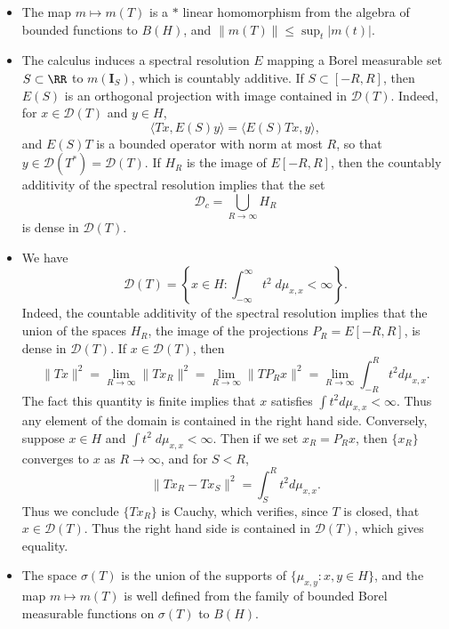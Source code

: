 \begin{itemize}
    \item The map $m \mapsto m(T)$ is a $*$ linear homomorphism from the algebra of bounded functions to $B(H)$, and $\| m(T) \| \leq \sup_t |m(t)|$.

    \item The calculus induces a spectral resolution $E$ mapping a Borel measurable set $S \subset \RR$ to $m(\mathbf{I}_S)$, which is countably additive. If $S \subset [-R,R]$, then $E(S)$ is an orthogonal projection with image contained in $\mathcal{D}(T)$. Indeed, for $x \in \mathcal{D}(T)$ and $y \in H$,
    \[ \langle Tx, E(S) y \rangle = \langle E(S) T x, y \rangle, \]
    and $E(S) T$ is a bounded operator with norm at most $R$, so that $y \in \mathcal{D}(T^*) = \mathcal{D}(T)$. If $H_R$ is the image of $E[-R,R]$, then the countably additivity of the spectral resolution implies that the set
    \[ \mathcal{D}_c = \bigcup_{R \to \infty} H_R \]
    is dense in $\mathcal{D}(T)$.

    \item We have
    \[ \mathcal{D}(T) = \left\{ x \in H : \int_{-\infty}^\infty t^2\; d\mu_{x,x} < \infty \right\}. \]
    Indeed, the countable additivity of the spectral resolution implies that the union of the spaces $H_R$, the image of the projections $P_R = E[-R,R]$, is dense in $\mathcal{D}(T)$. If $x \in \mathcal{D}(T)$, then
    \[ \| Tx \|^2 = \lim_{R \to \infty} \| Tx_R \|^2 = \lim_{R \to \infty} \| TP_R x \|^2 = \lim_{R \to \infty} \int_{-R}^R t^2 d\mu_{x,x}. \]
    The fact this quantity is finite implies that $x$ satisfies $\int t^2 d\mu_{x,x} < \infty$. Thus any element of the domain is contained in the right hand side. Conversely, suppose $x \in H$ and $\int t^2\; d\mu_{x,x} < \infty$. Then if we set $x_R = P_R x$, then $\{ x_R \}$ converges to $x$ as $R \to \infty$, and for $S < R$,
    \[ \| Tx_R - Tx_S \|^2 = \int_S^R t^2 d\mu_{x,x}. \]
    Thus we conclude $\{ Tx_R \}$ is Cauchy, which verifies, since $T$ is closed, that $x \in \mathcal{D}(T)$. Thus the right hand side is contained in $\mathcal{D}(T)$, which gives equality.

    \item The space $\sigma(T)$ is the union of the supports of $\{ \mu_{x,y} : x, y \in H \}$, and the map $m \mapsto m(T)$ is well defined from the family of bounded Borel measurable functions on $\sigma(T)$ to $B(H)$.
\end{itemize}

